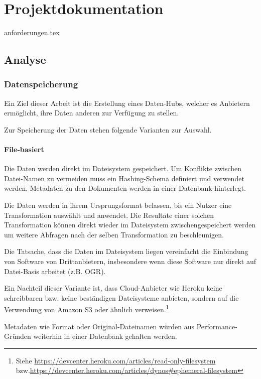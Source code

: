 \part{Projektdokumentation}

{anforderungen.tex}

\chapter{Analyse}


\section{Datenspeicherung}
Ein Ziel dieser Arbeit ist die Erstellung eines Daten-Hubs, welcher es Anbietern ermöglicht, ihre Daten anderen zur Verfügung zu stellen. 

Zur Speicherung der Daten stehen folgende Varianten zur Auswahl.

\subsection{File-basiert}
Die Daten werden direkt im Dateisystem gespeichert. Um Konflikte zwischen Datei-Namen zu vermeiden muss ein Hashing-Schema definiert und verwendet werden. Metadaten zu den Dokumenten werden in einer Datenbank hinterlegt.

Die Daten werden in ihrem Ursprungsformat belassen, bis ein Nutzer eine Transformation auswählt und anwendet. Die Resultate einer solchen Transformation können direkt wieder im Dateisystem zwischengespeichert werden um weitere Abfragen nach der selben Transformation zu beschleunigen.

Die Tatsache, dass die Daten im Dateisystem liegen vereinfacht die Einbindung von Software von Drittanbietern, insbesondere wenn diese Software nur direkt auf Datei-Basis arbeitet (z.B. OGR).

Ein Nachteil dieser Variante ist, dass Cloud-Anbieter wie Heroku keine schreibbaren bzw. keine beständigen Dateisysteme anbieten, sondern auf die Verwendung von Amazon S3 oder ähnlich verweisen.\footnote{Siehe \url{https://devcenter.heroku.com/articles/read-only-filesystem} bzw.\newline\url{https://devcenter.heroku.com/articles/dynos\#ephemeral-filesystem}}

Metadaten wie Format oder Original-Dateinamen würden aus Performance-Gründen weiterhin in einer Datenbank gehalten werden.

